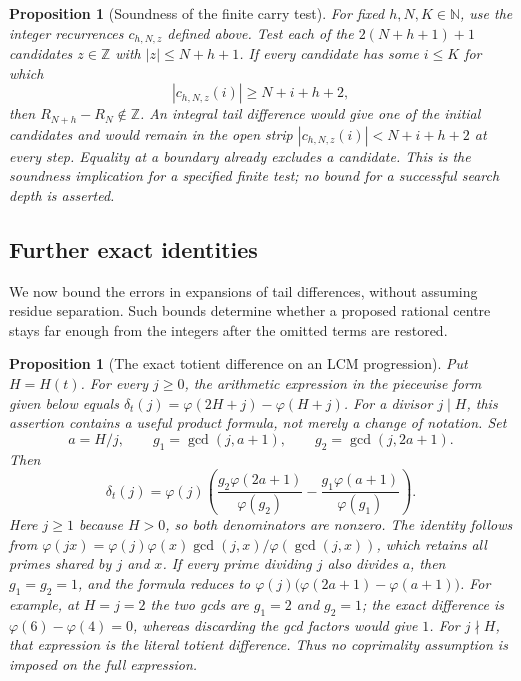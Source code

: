\documentclass[11pt]{article}
\theoremstyle{plain}
\newtheorem{prop}[thm]{Proposition}
\theoremstyle{definition}
\theoremstyle{remark}
\begin{document}
\begin{prop}[Soundness of the finite carry test]\label{prop:B12cons}
For fixed $h,N,K\in\mathbb N$, use the integer recurrences
$c_{h,N,z}$ defined above. Test each of the $2(N+h+1)+1$ candidates
$z\in\mathbb Z$ with $|z|\le N+h+1$. If every candidate has some
$i\le K$ for which
\[
 |c_{h,N,z}(i)|\ge N+i+h+2,
\]
then $R_{N+h}-R_N\notin\mathbb Z$.
An integral tail difference would give one of the initial candidates
and would remain in the \emph{open} strip
$|c_{h,N,z}(i)|<N+i+h+2$ at every step. Equality at a boundary already
excludes a candidate. This is the soundness implication for a specified
finite test; no bound for a successful search depth is asserted.

\end{prop}

\subsection{Further exact identities}

We now bound the errors in expansions of tail differences, without
assuming residue separation. Such bounds determine whether a
proposed rational centre stays far enough from the integers after
the omitted terms are restored.

\begin{prop}[The exact totient difference on an LCM progression]\label{prop:AR-04-inv}
Put $H=H(t)$. For every $j\ge0$, the arithmetic expression in the piecewise form given below equals $\delta_t(j)=\varphi(2H+j)-\varphi(H+j)$.
For a divisor $j\mid H$, this assertion contains a useful product
formula, not merely a change of notation. Set
\[
 a=H/j,\qquad g_1=\gcd(j,a+1),\qquad g_2=\gcd(j,2a+1).
\]
Then
\[
 \delta_t(j)=\varphi(j)\left(
 \frac{g_2\varphi(2a+1)}{\varphi(g_2)}
 -\frac{g_1\varphi(a+1)}{\varphi(g_1)}\right).
\]
Here $j\ge1$ because $H>0$, so both denominators are nonzero.
The identity follows from
$\varphi(jx)=\varphi(j)\varphi(x)\gcd(j,x)/\varphi(\gcd(j,x))$,
which retains all primes shared by $j$ and $x$.
If every prime dividing $j$ also divides $a$, then $g_1=g_2=1$,
and the formula reduces to
$\varphi(j)\bigl(\varphi(2a+1)-\varphi(a+1)\bigr)$.
For example, at $H=j=2$ the two gcds are $g_1=2$ and $g_2=1$;
the exact difference is $\varphi(6)-\varphi(4)=0$, whereas discarding
the gcd factors would give $1$.
For $j\nmid H$, that expression is the literal totient difference.
Thus no coprimality assumption is imposed on the full expression.

\end{prop}
\end{document}
